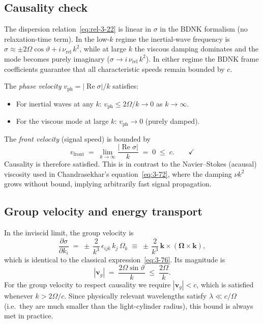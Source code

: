\subsection{Causality check}

\begin{causalitycheck}
The dispersion relation~\eqref{eq:rel-3-22} is linear in $\sigma$
in the BDNK formalism (no relaxation-time term).  In the low-$k$
regime the inertial-wave frequency is
$\sigma \approx \pm 2\Omega\cos\vartheta + i\,\nu_{\mathrm{rel}}\,k^{2}$,
while at large $k$ the viscous damping dominates and the mode
becomes purely imaginary ($\sigma \to i\,\nu_{\mathrm{rel}}\,k^{2}$).
In either regime the BDNK frame coefficients guarantee that all
characteristic speeds remain bounded by $c$.

The \emph{phase velocity} $v_{\mathrm{ph}} = |\operatorname{Re}\sigma|/k$
satisfies:
\begin{itemize}
  \item For inertial waves at any $k$:
    $v_{\mathrm{ph}} \leq 2\Omega/k \to 0$ as $k\to\infty$.
  \item For the viscous mode at large $k$:
    $v_{\mathrm{ph}} \to 0$ (purely damped).
\end{itemize}
The \emph{front velocity} (signal speed) is bounded by
\begin{equation}\label{eq:rel-3-26}
  v_{\mathrm{front}}
  \;=\;
  \lim_{k\to\infty} \frac{|\operatorname{Re}\sigma|}{k}
  \;=\; 0
  \;\leq\; c.
  \qquad\checkmark
\end{equation}
Causality is therefore satisfied.  This is in contrast to the
Navier--Stokes (acausal) viscosity used in Chandrasekhar's
equation~\eqref{eq:3-72}, where the damping $\nu k^{2}$ grows without
bound, implying arbitrarily fast signal propagation.
\end{causalitycheck}

\subsection{Group velocity and energy transport}

In the inviscid limit, the group velocity is
\begin{equation}\label{eq:rel-3-27}
  \frac{\partial\sigma}{\partial k_{i}}
  \;=\;
  \pm\,\frac{2}{k^{3}}\,
  \epsilon_{ijk}\,k_{j}\,\Omega_{k}
  \;\equiv\;
  \pm\,\frac{2}{k^{3}}\,
  \mathbf{k}\times(\boldsymbol{\Omega}\times\mathbf{k}),
\end{equation}
which is identical to the classical expression~\eqref{eq:3-76}.
Its magnitude is
\begin{equation}\label{eq:rel-3-28}
  |\mathbf{v}_{g}|
  \;=\;
  \frac{2\Omega\sin\vartheta}{k}
  \;\leq\;
  \frac{2\Omega}{k}.
\end{equation}
For the group velocity to respect causality we require
$|\mathbf{v}_{g}| < c$, which is satisfied whenever
$k > 2\Omega/c$.  Since physically relevant wavelengths satisfy
$\lambda \ll c/\Omega$ (i.e.\ they are much smaller than the
light-cylinder radius), this bound is always met in practice.

